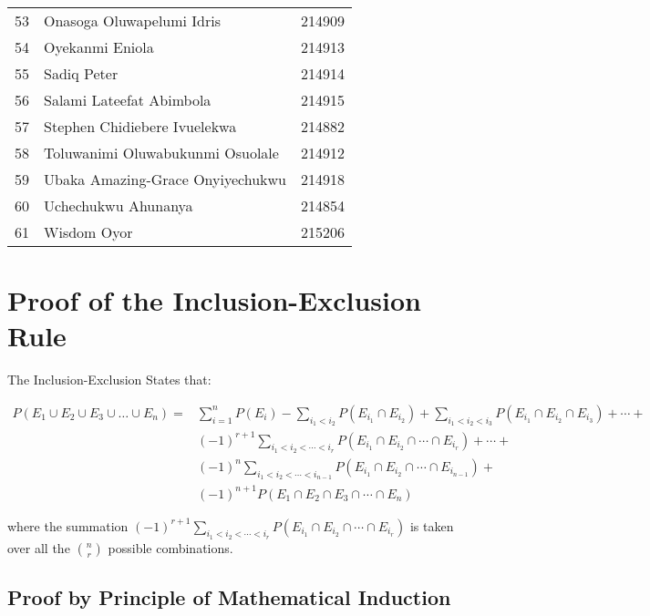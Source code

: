 \documentclass[a4paper]{article}
\begin{document}
\begin{center}
\begin{longtable} { c|l|c }
            53 & Onasoga Oluwapelumi Idris & 214909\\
            54 & Oyekanmi Eniola & 214913\\
            55 & Sadiq Peter & 214914\\
            56 & Salami Lateefat Abimbola & 214915\\
            57 & Stephen Chidiebere Ivuelekwa & 214882\\
            58 & Toluwanimi Oluwabukunmi Osuolale & 214912\\
            59 & Ubaka Amazing-Grace Onyiyechukwu & 214918\\
            60 & Uchechukwu Ahunanya & 214854\\
            61 & Wisdom Oyor & 215206\\
            \bottomrule[4pt]
        \end{longtable}
        \normalsize
    \end{center}

    \newpage
    \section*{Proof of the Inclusion-Exclusion Rule}
    The Inclusion-Exclusion States that:

    \begin{equation} \label{i_e_rule}
        \begin{split}
            P(E_1 \cup E_2 \cup E_3 \cup \dots \cup E_n) = & \sum_{i = 1}^{n} P(E_i) - \sum_{i_1 < i_2} P(E_{i_1} \cap E_{i_2}) + \sum_{i_1 < i_2 < i_3} P(E_{i_1} \cap E_{i_2} \cap E_{i_3}) + \cdots + \\
            & {(-1)}^{r + 1} \sum_{i_1 < i_2 < \cdots < i_r} P(E_{i_1} \cap E_{i_2} \cap \cdots \cap E_{i_r}) + \cdots + \\
            & {(-1)}^{n} \sum_{i_1 < i_2 < \cdots < i_{n-1}} P(E_{i_1} \cap E_{i_2} \cap \cdots \cap E_{i_{n-1}}) + \\
            & {(-1)}^{n + 1} P(E_1 \cap E_2 \cap E_3 \cap \cdots \cap E_n)
        \end{split}
    \end{equation}

    where the summation ${(-1)}^{r + 1} \sum_{i_1 < i_2 < \cdots < i_r} P(E_{i_1} \cap E_{i_2} \cap \cdots \cap E_{i_r})$ is taken over all the $\binom{n}{r}$ possible combinations.

    \subsection*{Proof by Principle of Mathematical Induction}
\end{document}
